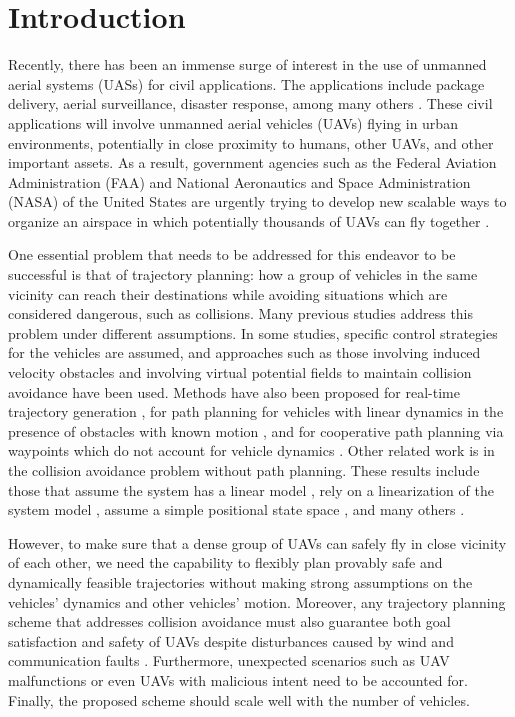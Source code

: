 \section{Introduction \label{sec:introduction}}
Recently, there has been an immense surge of interest in the use of unmanned aerial systems (UASs) for civil applications. The applications include package delivery, aerial surveillance, disaster response, among many others \cite{Tice91, Debusk10, Amazon16, AUVSI16, BBC16}. These civil applications will involve unmanned aerial vehicles (UAVs) flying in urban environments, potentially in close proximity to humans, other UAVs, and other important assets. As a result, government agencies such as the Federal Aviation Administration (FAA) and National Aeronautics and Space Administration (NASA) of the United States are urgently trying to develop new scalable ways to organize an airspace in which potentially thousands of UAVs can fly together \cite{FAA13, Kopardekar16}.

One essential problem that needs to be addressed for this endeavor to be successful is that of trajectory planning: how a group of vehicles in the same vicinity can reach their destinations while avoiding situations which are considered dangerous, such as collisions. Many previous studies address this problem under different assumptions. In some studies, specific control strategies for the vehicles are assumed, and approaches such as those involving induced velocity obstacles \cite{Fiorini98, Chasparis05, Vandenberg08,Wu2012} and involving virtual potential fields to maintain collision avoidance \cite{Olfati-Saber2002, Chuang07} have been used. Methods have also been proposed for real-time trajectory generation \cite{Feng-LiLian2002}, for path planning for vehicles with linear dynamics in the presence of obstacles with known motion \cite{Ahmadzadeh2009}, and for cooperative path planning via waypoints which do not account for vehicle dynamics \cite{Bellingham}. Other related work is in the collision avoidance problem without path planning. These results include those that assume the system has a linear model \cite{Beard2003, Schouwenaars2004, Stipanovic2007}, rely on a linearization of the system model \cite{Massink2001, Althoff2011}, assume a simple positional state space \cite{Lin2015}, and many others \cite{Lalish2008, Hoffmann2008, Chen2016}.

However, to make sure that a dense group of UAVs can safely fly in close vicinity of each other, we need the capability to flexibly plan provably safe and dynamically feasible trajectories without making strong assumptions on the vehicles' dynamics and other vehicles' motion. Moreover, any trajectory planning scheme that addresses collision avoidance must also guarantee both goal satisfaction and safety of UAVs despite disturbances caused by wind and communication faults \cite{Kopardekar16}. Furthermore, unexpected scenarios such as UAV malfunctions or even UAVs with malicious intent need to be accounted for. Finally, the proposed scheme should scale well with the number of vehicles.

